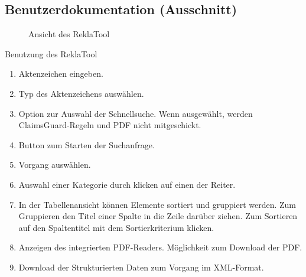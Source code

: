 \subsection{Benutzerdokumentation (Ausschnitt)}
\label{app:BenutzerDoku}
\begin{figure}[htb]
    \centering
    \caption{Ansicht des ReklaTool}
\end{figure}

Benutzung des ReklaTool
\begin{enumerate}
    \item Aktenzeichen eingeben.
    \item Typ des Aktenzeichens auswählen.
    \item Option zur Auswahl der Schnellsuche. Wenn ausgewählt, werden ClaimsGuard-Regeln und PDF nicht mitgeschickt.
    \item Button zum Starten der Suchanfrage.
    \item Vorgang auswählen.
    \item Auswahl einer Kategorie durch klicken auf einen der Reiter.
    \item In der Tabellenansicht können Elemente sortiert und gruppiert werden. Zum Gruppieren den Titel einer Spalte in die 
    Zeile darüber ziehen. Zum Sortieren auf den Spaltentitel mit dem Sortierkriterium klicken.
    \item Anzeigen des integrierten PDF-Readers. Möglichkeit zum Download der PDF.
    \item Download der Strukturierten Daten zum Vorgang im XML-Format.
\end{enumerate}